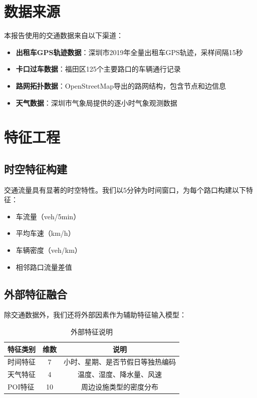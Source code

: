 \documentclass{harryopo-report}
\begin{document}
\section{数据来源}

本报告使用的交通数据来自以下渠道：

\begin{itemize}
    \item \textbf{出租车GPS轨迹数据}：深圳市2019年全量出租车GPS轨迹，采样间隔15秒
    \item \textbf{卡口过车数据}：福田区125个主要路口的车辆通行记录
    \item \textbf{路网拓扑数据}：OpenStreetMap导出的路网结构，包含节点和边信息
    \item \textbf{天气数据}：深圳市气象局提供的逐小时气象观测数据
\end{itemize}

\section{特征工程}

\subsection{时空特征构建}

交通流量具有显著的时空特性。我们以5分钟为时间窗口，为每个路口构建以下特征：

\begin{itemize}
    \item 车流量（veh/5min）
    \item 平均车速（km/h）
    \item 车辆密度（veh/km）
    \item 相邻路口流量差值
\end{itemize}

\subsection{外部特征融合}

除交通数据外，我们还将外部因素作为辅助特征输入模型：

\begin{table}[htbp]
\centering
\begin{tabular}{lcc}
\toprule
\textbf{特征类别} & \textbf{维数} & \textbf{说明} \\
\midrule
时间特征 & 7 & 小时、星期、是否节假日等独热编码 \\
天气特征 & 4 & 温度、湿度、降水量、风速 \\
POI特征  & 10 & 周边设施类型的密度分布 \\
\bottomrule
\end{tabular}
\caption{外部特征说明}
\label{tab:features}
\end{table}
\end{document}
